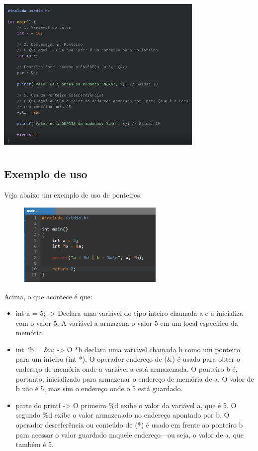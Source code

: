\documentclass{report}
\begin{document}
	\begin{center}
		
		\includegraphics[width=10cm,height=8cm,keepaspectratio=false]{imagens/pointer.png}
		
	\end{center}
	
	
	\subsection{Exemplo de uso}
	Veja abaixo um exemplo de uso de ponteiros:
	
	\begin{figure}[ht]
		\centering
		\includegraphics[width=7cm,height=4cm,keepaspectratio=false]{imagens/ponteiro.png}
		
	\end{figure}
	
	Acima, o que acontece é que:
	
	\begin{itemize}
		\item int a = 5; -> Declara uma variável do tipo inteiro chamada a e a inicializa com o valor 5. A variável a armazena o valor 5 em um local específico da memória
		\item int *b = \&a; -> O *b declara uma variável chamada b como um ponteiro para um inteiro (int *). O operador endereço de (\&) é usado para obter o endereço de memória onde a variável a está armazenada. O ponteiro b é, portanto, inicializado para armazenar o endereço de memória de a. O valor de b não é 5, mas sim o endereço onde o 5 está guardado.
		\item parte do printf -> O primeiro \%d exibe o valor da variável a, que é 5. O segundo \%d exibe o valor armazenado no endereço apontado por b. O operador desreferência ou conteúdo de (*) é usado em frente ao ponteiro b para acessar o valor guardado naquele endereço—ou seja, o valor de a, que também é 5.
	\end{itemize}
	
\end{document}
